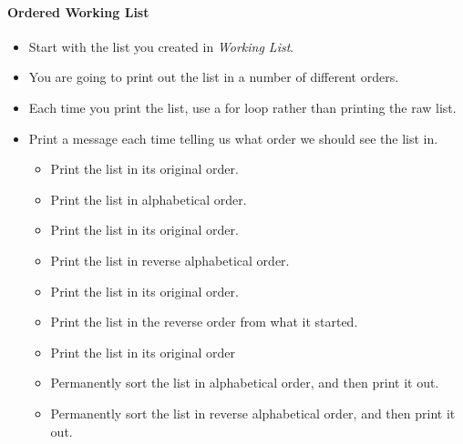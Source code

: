 \documentclass[11pt]{article}
\providecommand{\tightlist}{%
      \setlength{\itemsep}{0pt}\setlength{\parskip}{0pt}}
\begin{document}
    \hypertarget{ordered-working-list}{%
\paragraph{Ordered Working List}\label{ordered-working-list}}

\begin{itemize}
\tightlist
\item
  Start with the list you created in \emph{Working List}.
\item
  You are going to print out the list in a number of different orders.
\item
  Each time you print the list, use a for loop rather than printing the
  raw list.
\item
  Print a message each time telling us what order we should see the list
  in.

  \begin{itemize}
  \tightlist
  \item
    Print the list in its original order.
  \item
    Print the list in alphabetical order.
  \item
    Print the list in its original order.
  \item
    Print the list in reverse alphabetical order.
  \item
    Print the list in its original order.
  \item
    Print the list in the reverse order from what it started.
  \item
    Print the list in its original order
  \item
    Permanently sort the list in alphabetical order, and then print it
    out.
  \item
    Permanently sort the list in reverse alphabetical order, and then
    print it out.
  \end{itemize}
\end{itemize}
\end{document}
